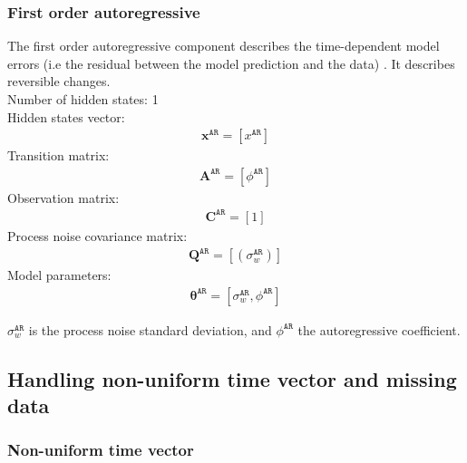 \subsubsection{First order autoregressive}

The first order autoregressive component describes the time-dependent model errors (i.e the residual between the model prediction and the data) \cite{STC:STC2035}. 
It describes reversible changes.\\

\noindent
Number of hidden states: 1\\

Hidden states vector: 
\begin{gather*}
\mathbf{x}^{\mathtt{AR}} = [x^{\mathtt{AR}}]
\end{gather*}
Transition matrix: 
\begin{gather*}
\mathbf{A}^{\mathtt{AR}}=  [\phi^{\mathtt{AR}}]
\end{gather*}
Observation matrix: 
\begin{gather*}
\mathbf{C}^{\mathtt{AR}}=[1]
\end{gather*}
Process noise covariance matrix: 
\begin{gather*}
\mathbf{Q}^{\mathtt{AR}}=[(\sigma_{w}^{\mathtt{AR}})]
\end{gather*}
Model parameters: 
\begin{gather*}
\bm\theta^{\mathtt{AR}}=[\sigma_{w}^{\mathtt{AR}}, \phi^{\mathtt{AR}} ]
\end{gather*}

\noindent
$\sigma_{w}^{\mathtt{AR}}$ is the process noise standard deviation, and $\phi^{\mathtt{AR}}$ the autoregressive coefficient.

\subsection{Handling non-uniform time vector and missing data}
\label{SS:HandlingNonUniformMissingData}

\subsubsection{Non-uniform time vector}
\label{SS:NonUniform}

